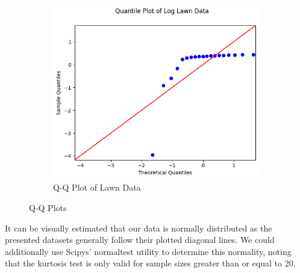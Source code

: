 \documentclass{report}
\begin{document}
\begin{figure}[H]
	~
	\begin{subfigure}[h]{0.4\textwidth}
		\centering
		\includegraphics[width=\textwidth]{images/lawn_log_qq}
		\caption{Q-Q Plot of Lawn Data}
		\label{fig:qqlawn}
	\end{subfigure}
	\caption{Q-Q Plots}
	\label{fig:qqplot}
\end{figure}

It can be visually estimated that our data is normally distributed as
the presented datasets generally follow their plotted diagonal lines. We
could additionally use Scipys' normaltest utility to determine this
normality, noting that the kurtosis test is only valid for sample sizes
greater than or equal to 20.
\end{document}
